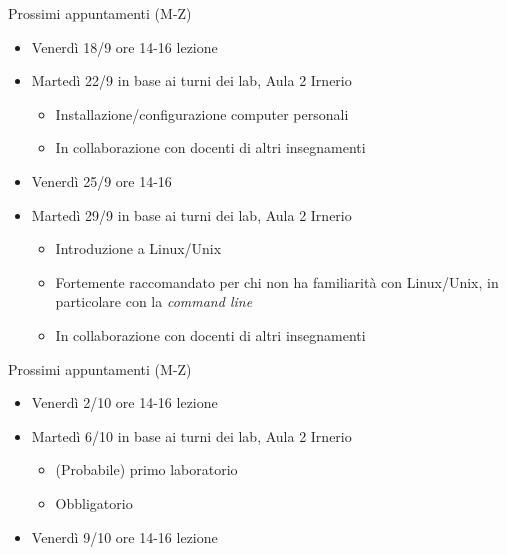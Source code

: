 \begin{frame}{Prossimi appuntamenti (M-Z)}

  \begin{itemize}
  \item Venerdì 18/9 ore 14-16 lezione
  \item Martedì 22/9 in base ai turni dei lab, Aula 2 Irnerio
    \begin{itemize}
    \item Installazione/configurazione computer personali
    \item In collaborazione con docenti di altri insegnamenti
    \end{itemize}
  \item Venerdì 25/9 ore 14-16
  \item Martedì 29/9 in base ai turni dei lab, Aula 2 Irnerio
    \begin{itemize}
    \item Introduzione a Linux/Unix
    \item Fortemente raccomandato per chi non ha familiarità con Linux/Unix, in
      particolare con la \textit{command line}
    \item In collaborazione con docenti di altri insegnamenti
    \end{itemize}
  \end{itemize}

\end{frame}

\begin{frame}{Prossimi appuntamenti (M-Z) \insertcontinuationtext}

  \begin{itemize}
  \item Venerdì 2/10 ore 14-16 lezione
  \item Martedì 6/10 in base ai turni dei lab, Aula 2 Irnerio
    \begin{itemize}
    \item (Probabile) primo laboratorio
    \item Obbligatorio
    \end{itemize}
  \item Venerdì 9/10 ore 14-16 lezione
  \end{itemize}

\end{frame}

